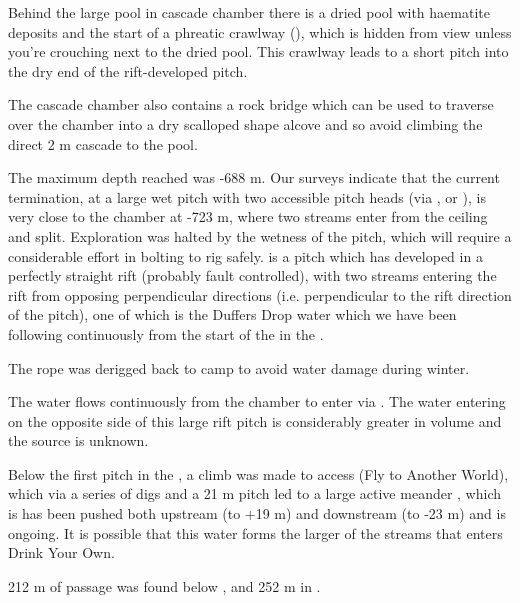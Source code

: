 Behind the large pool in cascade chamber there is a dried pool with
haematite deposits and the start of a phreatic crawlway (), which is hidden from view unless you're crouching next to the
dried pool. This crawlway leads to a short pitch into the dry end of the
rift-developed  pitch.

The cascade chamber also contains a rock bridge which can be used to
traverse over the chamber into a dry scalloped shape alcove and so avoid
climbing the direct 2 m cascade to the pool.

The maximum depth reached was -688 m. Our surveys indicate that the
current termination, at a large wet pitch with two accessible pitch
heads (via , or ), is very close to
the  chamber at -723 m, where two streams enter from the
ceiling and split. Exploration was halted by the wetness of the pitch,
which will require a considerable effort in bolting to rig safely.
 is a pitch which has developed in a perfectly
straight rift (probably fault controlled), with two streams entering the
rift from opposing perpendicular directions (i.e. perpendicular to the
rift direction of the pitch), one of which is the Duffers Drop water
which we have been following continuously from the start of the
 in the .

The  rope was derigged back to camp to avoid water
damage during winter.

The  water flows continuously from the  chamber to enter  via .
The water entering on the opposite side of this large rift pitch is
considerably greater in volume and the source is unknown.

Below the first pitch in the , a climb was made to
access  (Fly to Another World), which via a
series of digs and a 21 m pitch led to a large active meander  , which is has been
pushed both upstream (to +19 m) and downstream (to -23 m) and is
ongoing. It is possible that this water forms the larger of the streams
that enters Drink Your Own.

212 m of passage was found below , and 252 m in
.


\subsection{\texorpdfstring{}{Insomnia}}

